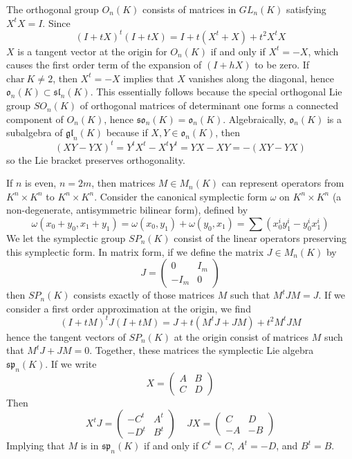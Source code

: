 \begin{example}
    The orthogonal group $O_n(K)$ consists of matrices in $GL_n(K)$ satisfying $X^tX = I$. Since
    \[ (I + tX)^t(I + tX) = I + t(X^t + X) + t^2X^tX \]
    $X$ is a tangent vector at the origin for $O_n(K)$ if and only if $X^t = -X$, which causes the first order term of the expansion of $(I + hX)$ to be zero. If $\text{char}\ K \neq 2$, then $X^t = -X$ implies that $X$ vanishes along the diagonal, hence $\mathfrak{o}_n(K) \subset \mathfrak{sl}_n(K)$. This essentially follows because the special orthogonal Lie group $SO_n(K)$ of orthogonal matrices of determinant one forms a connected component of $O_n(K)$, hence $\mathfrak{so}_n(K) = \mathfrak{o}_n(K)$. Algebraically, $\mathfrak{o}_n(K)$ is a subalgebra of $\mathfrak{gl}_n(K)$ because if $X,Y \in \mathfrak{o}_n(K)$, then
    \[ (XY - YX)^t = Y^tX^t - X^tY^t = YX - XY = -(XY - YX) \]
    so the Lie bracket preserves orthogonality.
\end{example}

\begin{example}
    If $n$ is even, $n = 2m$, then matrices $M \in M_n(K)$ can represent operators from $K^n \times K^n$ to $K^n \times K^n$. Consider the canonical symplectic form $\omega$ on $K^n \times K^n$ (a non-degenerate, antisymmetric bilinear form), defined by
    \[ \omega(x_0 + y_0, x_1 + y_1) = \omega(x_0,y_1) + \omega(y_0,x_1) = \sum (x_0^i y_1^i - y_0^i x_1^i) \]
    We let the symplectic group $SP_n(K)$ consist of the linear operators preserving this symplectic form. In matrix form, if we define the matrix $J \in M_n(K)$ by
    \[ J = \begin{pmatrix} 0 & I_m \\ -I_m & 0 \end{pmatrix} \]
    then $SP_n(K)$ consists exactly of those matrices $M$ such that $M^tJM = J$. If we consider a first order approximation at the origin, we find
    \[ (I + tM)^tJ(I + tM) = J + t(M^tJ + JM) + t^2M^tJM \]
    hence the tangent vectors of $SP_n(K)$ at the origin consist of matrices $M$ such that $M^tJ + JM = 0$. Together, these matrices the symplectic Lie algebra $\mathfrak{sp}_n(K)$. If we write
    \[ X = \begin{pmatrix} A & B \\ C & D \end{pmatrix} \]
    Then
    \[ X^tJ = \begin{pmatrix} -C^t & A^t \\ -D^t & B^t \end{pmatrix}\ \ \ \ \ JX = \begin{pmatrix} C & D \\ -A & -B \end{pmatrix} \]
    Implying that $M$ is in $\mathfrak{sp}_n(K)$ if and only if $C^t = C$, $A^t= -D$, and $B^t = B$.
\end{example}

